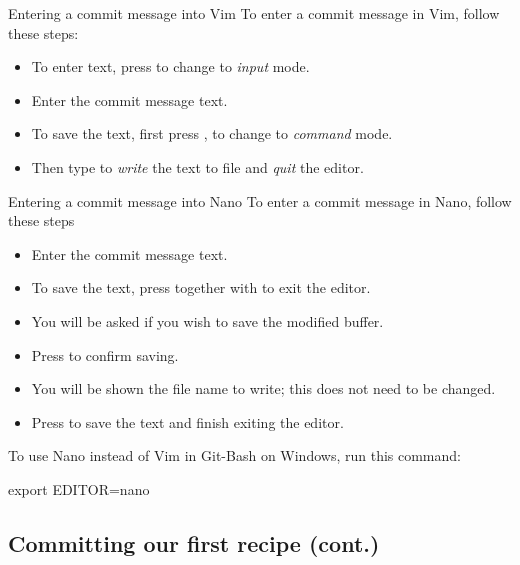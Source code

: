 \begin{frame}[fragile]{Entering a commit message into Vim}
    To enter a commit message in Vim, follow these steps:
    \begin{itemize}
        \item To enter text, press  to change to \emph{input} mode.
        \item Enter the commit message text.
        \item To save the text, first press , to change to
            \emph{command} mode.
        \item Then type  to \emph{write} the text to file and
            \emph{quit} the editor.
    \end{itemize}
\end{frame}

\begin{frame}[fragile]{Entering a commit message into Nano}
    To enter a commit message in Nano, follow these steps
    \begin{itemize}
        \item Enter the commit message text.
        \item To save the text, press  together with  to
            exit the editor.
        \item You will be asked if you wish to save the modified buffer.
        \item Press  to confirm saving.
        \item You will be shown the file name to write; this does not need
            to be changed.
        \item Press  to save the text and finish exiting the
            editor.
    \end{itemize}

    To use Nano instead of Vim in Git-Bash on Windows, run this command:
    \begin{shellcode}
        export EDITOR=nano
    \end{shellcode}
\end{frame}

\subsection{Committing our first recipe (cont.)}

